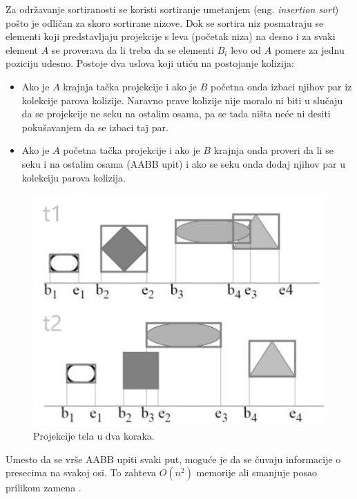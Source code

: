 \documentclass[12pt,oneside]{memoir}
\begin{document}
Za održavanje sortiranosti se koristi sortiranje umetanjem (eng. {\em insertion sort}) pošto je odličan za skoro sortirane nizove.
Dok se sortira niz posmatraju se elementi koji predstavljaju projekcije s leva (početak niza) na desno i za svaki element $A$ se proverava da li treba da se elementi $B_i$ levo od $A$
pomere za jednu poziciju udesno. Postoje dva uslova koji utiču na postojanje kolizija:
\begin{itemize}  
	\item Ako je $A$ krajnja tačka projekcije i ako je $B$ početna onda izbaci njihov par iz kolekcije parova kolizije.
	Naravno prave kolizije nije moralo ni biti u slučaju da se projekcije ne seku na ostalim osama, 
	pa se tada ništa neće ni desiti pokušavanjem da se izbaci taj par.
	\item Ako je $A$ početna tačka projekcije i ako je $B$ krajnja onda proveri da li se seku i na ostalim osama (AABB upit) i ako se seku onda
	dodaj njihov par u kolekciju parova kolizija.

\end{itemize}  


\begin{figure}[h!]
	\begin{center}
	\includegraphics[scale=1]{sap.jpg}
	\end{center}
	\caption{Projekcije tela u dva koraka.}
	\label{fig:sap}
\end{figure}

Umesto da se vrše AABB upiti svaki put, moguće je da se čuvaju informacije o presecima 
na svakoj osi. To zahteva $O(n^2)$ memorije ali smanjuje posao prilikom zamena \cite{sap}. 
\end{document}
